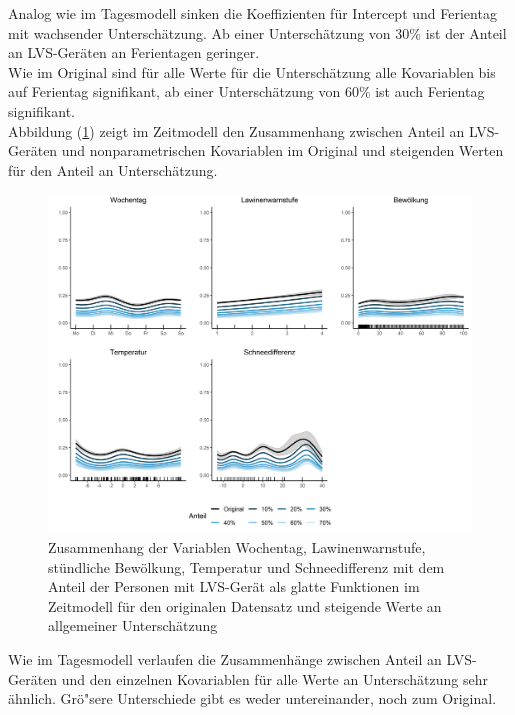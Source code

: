\documentclass[12pt]{scrreprt}
\begin{document}
\noindent Analog wie im Tagesmodell sinken die Koeffizienten für Intercept und Ferientag mit wachsender Unterschätzung. Ab einer Unterschätzung von 30\% ist der Anteil an LVS-Geräten an Ferientagen geringer. \\
Wie im Original sind für alle Werte für die Unterschätzung alle Kovariablen bis auf Ferientag signifikant, ab einer Unterschätzung von 60\% ist auch Ferientag signifikant. \\
Abbildung (\ref{pic:time_model_general_comparison}) zeigt im Zeitmodell den Zusammenhang zwischen Anteil an LVS-Geräten und nonparametrischen Kovariablen im Original und steigenden Werten für den Anteil an Unterschätzung.
\begin{figure}[H]
	\centering
	\includegraphics[width=\linewidth]{plots/time_model_general_comparison}
	\caption{Zusammenhang der Variablen Wochentag, Lawinenwarnstufe, stündliche Bewölkung, Temperatur und Schneedifferenz mit dem Anteil der Personen mit LVS-Gerät als glatte Funktionen im Zeitmodell für den originalen Datensatz und steigende Werte an allgemeiner Unterschätzung}
	\label{pic:time_model_general_comparison}	
\end{figure}
\noindent Wie im Tagesmodell verlaufen die Zusammenhänge zwischen Anteil an LVS-Geräten und den einzelnen Kovariablen für alle Werte an Unterschätzung sehr ähnlich. Grö"sere Unterschiede gibt es weder untereinander, noch zum Original.
\end{document}
